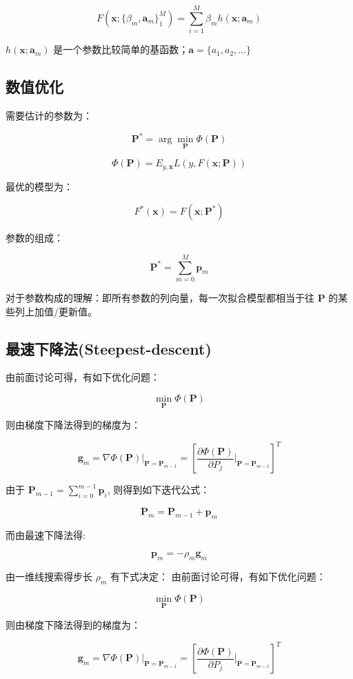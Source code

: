\documentclass[
  letterpaper,
  DIV=11,
  numbers=noendperiod]{scrartcl}
\begin{document}
\[
F(\mathbf x;\{\beta_m,\mathbf a_m\}_1^M)=\sum_{i=1}^M\beta_mh(\mathbf x;\mathbf a_m)
\]

\(h(\mathbf x;\mathbf a_m)\)
是一个参数比较简单的基函数；\(\mathbf a=\{a_1,a_2,\ldots\}\)

\subsection{数值优化}\label{ux6570ux503cux4f18ux5316}

需要估计的参数为：

\[
\mathbf P^*=\arg\min_{\mathbf P}\Phi(\mathbf P)
\]

\[
\Phi(\mathbf P)=E_{y,\mathbf x}L(y,F(\mathbf x;\mathbf P))
\]

最优的模型为：

\[
F^*(\mathbf x)=F(\mathbf x;\mathbf P^*)
\]

参数的组成：

\[
\mathbf P^*=\sum_{m=0}^M\mathbf p_m
\]

对于参数构成的理解：即所有参数的列向量，每一次拟合模型都相当于往
\(\mathbf P\) 的某些列上加值/更新值。

\subsection{最速下降法(Steepest-descent)}\label{ux6700ux901fux4e0bux964dux6cd5steepest-descent}

由前面讨论可得，有如下优化问题：

\[
\min_{\mathbf P}\Phi(\mathbf P)
\]

则由梯度下降法得到的梯度为：

\[
\mathbf g_m=\nabla\Phi(\mathbf P)|_{\mathbf P=\mathbf P_{m-1}}=[\frac{\partial\Phi(\mathbf P)}{\partial P_j}|_{\mathbf P =\mathbf P_{m-1} }]^T
\]

由于 \(\mathbf P_{m-1}=\sum_{i=0}^{m-1}\mathbf p_i\),
则得到如下迭代公式：

\[
\mathbf P_m=\mathbf P_{m-1}+\mathbf p_m
\]

而由最速下降法得:

\[
\mathbf p_m=-\rho_m\mathbf g_m
\]

由一维线搜索得步长 \(\rho_m\) 有下式决定：
由前面讨论可得，有如下优化问题：

\[
\min_{\mathbf P}\Phi(\mathbf P)
\]

则由梯度下降法得到的梯度为：

\[
\mathbf g_m=\nabla\Phi(\mathbf P)|_{\mathbf P=\mathbf P_{m-1}}=[\frac{\partial\Phi(\mathbf P)}{\partial P_j}|_{\mathbf P =\mathbf P_{m-1} }]^T
\]
\end{document}
